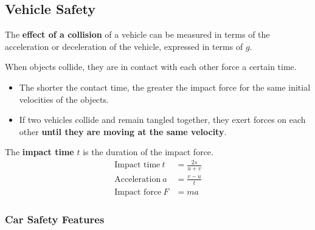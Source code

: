 \subsection{Vehicle Safety}

The \textbf{effect of a collision} of a vehicle can be measured in terms of the acceleration or deceleration of the vehicle, expressed in terms of $g$.

When objects collide, they are in contact with each other force a certain time.
\begin{itemize}
    \item The shorter the contact time, the greater the impact force for the same initial velocities of the objects.
    \item If two vehicles collide and remain tangled together, they exert forces on each other \textbf{until they are moving at the same velocity}.
\end{itemize}

The \textbf{impact time} $t$ is the duration of the impact force.
\begin{align*}
    \text{Impact time}\ t&=\frac{2s}{u+v}\\
    \text{Acceleration}\ a&=\frac{v-u}{t}\\
    \text{Impact force}\ F&=ma
\end{align*}

\subsubsection*{Car Safety Features}

